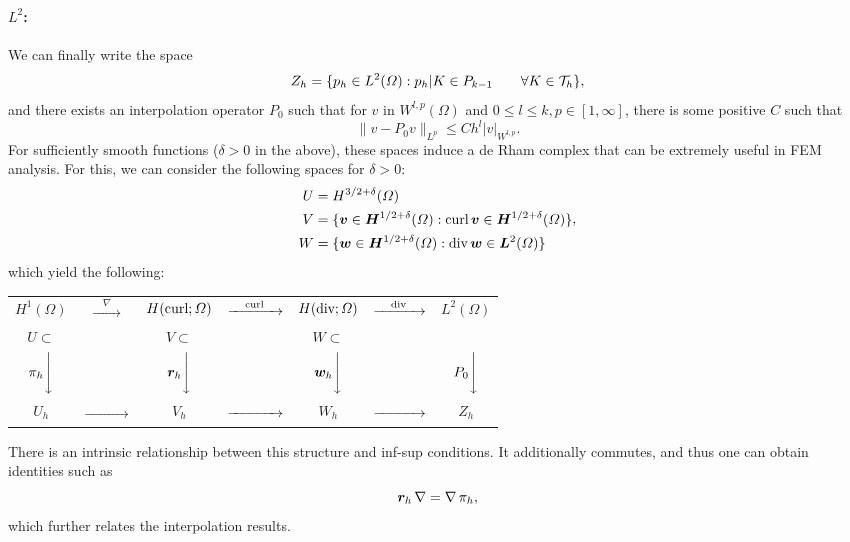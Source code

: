 \paragraph{$L^2$:} We can finally write the space 
    \begin{equation*}
Z_h = \{ p_h \in L^2(\Omega): p_h|K \in P_{k-1} \qquad \forall K\in \mathcal{T}_h\},
\end{equation*}
and there exists an interpolation operator $P_0$ such that for $v$ in $W^{l,p}(\Omega)$ and $0\leq l \leq k, p\in[1,\infty]$, there is some positive $C$ such that
    \begin{equation*}
\| v - P_0v\|_{L^p} \leq C h^l |v|_{W^{l,p}}.
\end{equation*}
For sufficiently smooth functions ($\delta>0$ in the above), these spaces induce a de Rham complex that can be extremely useful in FEM analysis. For this, we can consider the following spaces for $\delta > 0$: 
    \begin{equation*}
\begin{aligned}
        U &= H^{3/2+\delta}(\Omega) \\
        V &= \{\vec v \in \vec H^{1/2+\delta}(\Omega) : \curl \vec v \in \vec H^{1/2+\delta}(\Omega)\} \\
        W &= \{ \vec w \in \vec H^{1/2+\delta}(\Omega): \dive \vec w \in \vec L^2(\Omega) \}
    \end{aligned},
\end{equation*}
which yield the following: 

    \begin{center} 
    \begin{tabular}{ccccccc}
    $H^1(\Omega)$ & $\xrightarrow{\quad\nabla\quad}$& $H(\operatorname{\text{curl}};\Omega)$ & $\xrightarrow{\quad\operatorname{\text{curl}}\quad}$ & $H(\operatorname{\text{div}};\Omega)$ & $\xrightarrow{\quad\operatorname{\text{div}}\quad} $ & $L^2(\Omega)$ \\
    $U\subset$ & & $V\subset$ & & $W \subset$ & &  \\
    $\pi_h \Bigg\downarrow$ && $\vec r_h \Bigg\downarrow$ && $\vec w_h\Bigg\downarrow$ && $P_0 \Bigg\downarrow$ \\
    $U_h$ & $\xrightarrow{\quad\phantom{nabla}\quad}$& $V_h$ & $\xrightarrow{\quad\phantom{\curl}\quad}$ & $W_h$ & $\xrightarrow{\quad\phantom{\dive}\quad} $ & $Z_h$ \\
    \end{tabular}
    \end{center} 
There is an intrinsic relationship between this structure and inf-sup conditions. It additionally commutes, and thus one can obtain identities such as 
    \begin{equation*}
\vec r_h \grad = \grad \pi_h,
\end{equation*}
which further relates the interpolation results. 

